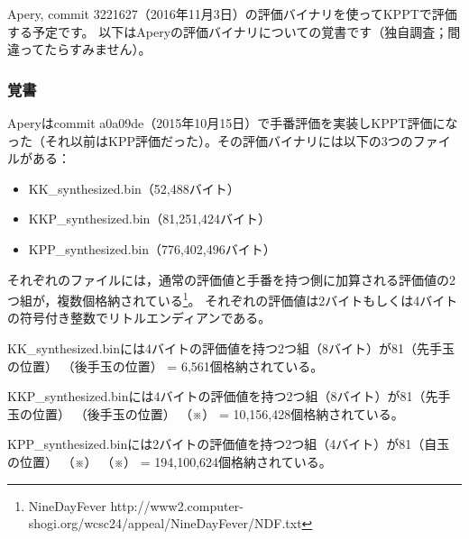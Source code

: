 \documentclass[a4paper]{ltjsarticle}
\begin{document}
Apery, commit 3221627（2016年11月3日）の評価バイナリを使ってKPPTで評価する予定です。
以下はAperyの評価バイナリについての覚書です（独自調査；間違ってたらすみません）。

\subsubsection*{覚書}
Aperyはcommit a0a09de（2015年10月15日）で手番評価を実装しKPPT評価になった（それ以前はKPP評価だった）。その評価バイナリには以下の3つのファイルがある：

\begin{itemize}
  \item KK\_synthesized.bin（52,488バイト）
  \item KKP\_synthesized.bin（81,251,424バイト）
  \item KPP\_synthesized.bin（776,402,496バイト）
\end{itemize}

それぞれのファイルには，通常の評価値と手番を持つ側に加算される評価値の2つ組が，複数個格納されている\footnote{NineDayFever http://www2.computer-shogi.org/wcsc24/appeal/NineDayFever/NDF.txt}。
それぞれの評価値は2バイトもしくは4バイトの符号付き整数でリトルエンディアンである。

KK\_synthesized.binには4バイトの評価値を持つ2つ組（8バイト）が81（先手玉の位置） （後手玉の位置） = 6,561個格納されている。

KKP\_synthesized.binには4バイトの評価値を持つ2つ組（8バイト）が81（先手玉の位置） （後手玉の位置） （※） = 10,156,428個格納されている。

KPP\_synthesized.binには2バイトの評価値を持つ2つ組（4バイト）が81（自玉の位置） （※） （※） = 194,100,624個格納されている。\\
\end{document}
